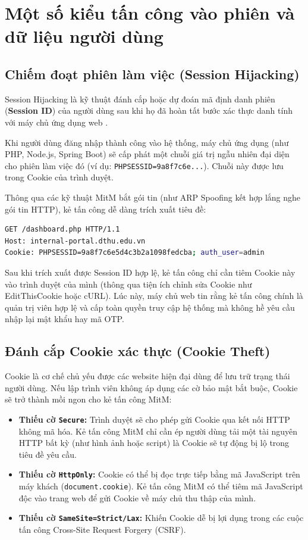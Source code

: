 \section{Một số kiểu tấn công vào phiên và dữ liệu người dùng}

\subsection{Chiếm đoạt phiên làm việc (Session Hijacking)}

Session Hijacking là kỹ thuật đánh cắp hoặc dự đoán mã định danh phiên (\textbf{Session ID}) của người dùng sau khi họ đã hoàn tất bước xác thực danh tính với máy chủ ứng dụng web \cite{alani2014mitm}.

Khi người dùng đăng nhập thành công vào hệ thống, máy chủ ứng dụng (như PHP, Node.js, Spring Boot) sẽ cấp phát một chuỗi giá trị ngẫu nhiên đại diện cho phiên làm việc đó (ví dụ: \texttt{PHPSESSID=9a8f7c6e...}). Chuỗi này được lưu trong Cookie của trình duyệt. 

Thông qua các kỹ thuật MitM bắt gói tin (như ARP Spoofing kết hợp lắng nghe gói tin HTTP), kẻ tấn công dễ dàng trích xuất tiêu đề:
\begin{lstlisting}[language=bash]
GET /dashboard.php HTTP/1.1
Host: internal-portal.dthu.edu.vn
Cookie: PHPSESSID=9a8f7c6e5d4c3b2a1098fedcba; auth_user=admin
\end{lstlisting}

Sau khi trích xuất được Session ID hợp lệ, kẻ tấn công chỉ cần tiêm Cookie này vào trình duyệt của mình (thông qua tiện ích chỉnh sửa Cookie như EditThisCookie hoặc cURL). Lúc này, máy chủ web tin rằng kẻ tấn công chính là quản trị viên hợp lệ và cấp toàn quyền truy cập hệ thống mà không hề yêu cầu nhập lại mật khẩu hay mã OTP.

\subsection{Đánh cắp Cookie xác thực (Cookie Theft)}

Cookie là cơ chế chủ yếu được các website hiện đại dùng để lưu trữ trạng thái người dùng. Nếu lập trình viên không áp dụng các cờ bảo mật bắt buộc, Cookie sẽ trở thành mồi ngon cho kẻ tấn công MitM:
\begin{itemize}
  \item \textbf{Thiếu cờ \texttt{Secure}:} Trình duyệt sẽ cho phép gửi Cookie qua kết nối HTTP không mã hóa. Kẻ tấn công MitM chỉ cần ép người dùng tải một tài nguyên HTTP bất kỳ (như hình ảnh hoặc script) là Cookie sẽ tự động bị lộ trong tiêu đề yêu cầu.
  \item \textbf{Thiếu cờ \texttt{HttpOnly}:} Cookie có thể bị đọc trực tiếp bằng mã JavaScript trên máy khách (\texttt{document.cookie}). Kẻ tấn công MitM có thể tiêm mã JavaScript độc vào trang web để gửi Cookie về máy chủ thu thập của mình.
  \item \textbf{Thiếu cờ \texttt{SameSite=Strict/Lax}:} Khiến Cookie dễ bị lợi dụng trong các cuộc tấn công Cross-Site Request Forgery (CSRF).
\end{itemize}


